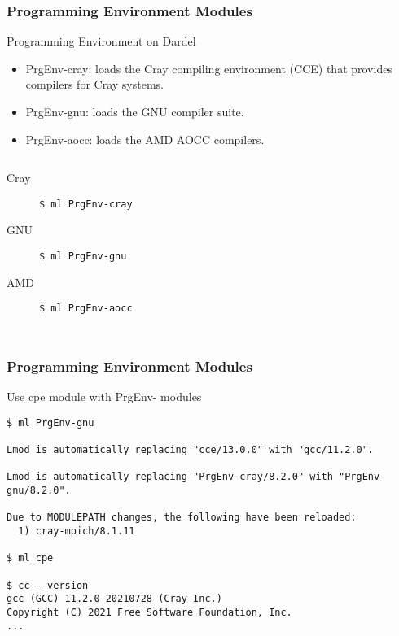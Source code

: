 \begin{frame}[fragile]
\frametitle{Programming Environment Modules}
\begin{exampleblock}{Programming Environment on Dardel}
\begin{itemize}
  \item PrgEnv-cray:
    loads the Cray compiling environment (CCE) that provides compilers for Cray systems.
  \item PrgEnv-gnu:
    loads the GNU compiler suite.
  \item PrgEnv-aocc:
    loads the AMD AOCC compilers.
\end{itemize}
\end{exampleblock}
\begin{columns}[t]
\begin{description}
    \item [Cray] \verb|$ ml PrgEnv-cray|
    \item [GNU]  \verb|$ ml PrgEnv-gnu|
    \item [AMD]  \verb|$ ml PrgEnv-aocc|
\end{description}
\end{columns}
\end{frame}


\begin{frame}[fragile]
\frametitle{Programming Environment Modules}
    \begin{exampleblock}{ Use cpe module with PrgEnv- modules }
    \footnotesize
    \begin{verbatim}
$ ml PrgEnv-gnu

Lmod is automatically replacing "cce/13.0.0" with "gcc/11.2.0".

Lmod is automatically replacing "PrgEnv-cray/8.2.0" with "PrgEnv-gnu/8.2.0".

Due to MODULEPATH changes, the following have been reloaded:
  1) cray-mpich/8.1.11

$ ml cpe

$ cc --version
gcc (GCC) 11.2.0 20210728 (Cray Inc.)
Copyright (C) 2021 Free Software Foundation, Inc.
...
    \end{verbatim}
    \end{exampleblock}
\end{frame}



